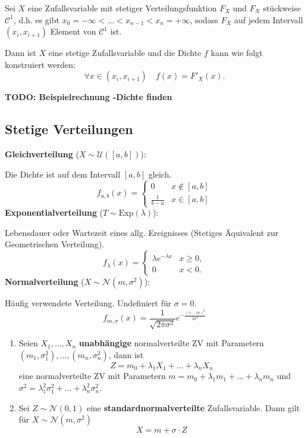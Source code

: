 Sei $X$ eine Zufallsvariable mit stetiger Verteilungsfunktion $F_X$ und $F_X$ stückweise $\mathcal{C}^1$, d.h. es gibt $x_0 = - \infty < \ldots < x_{n-1} < x_n = +\infty$, sodass $F_X$ auf jedem Intervall $(x_i, x_{i+1})$ Element von $\mathcal{C}^1$ ist. 

Dann ist $X$ eine stetige Zufallsvariable und die Dichte $f$ kann wie folgt konstruiert werden:
$$\forall x \in (x_i, x_{i+1}) \quad f(x) = F'_X(x).$$

\textbf{TODO: Beispielrechnung -Dichte finden}

\subsection{Stetige Verteilungen}
\textbf{Gleichverteilung} ($X \sim \mathcal{U}([a,b])$): 

Die Dichte ist auf dem Intervall $[a, b]$ gleich. 
$$f_{a,b}(x) = \begin{cases}
    0 & x \notin [a,b]\\
    \frac{1}{b-a} & x \in [a,b]
\end{cases}$$
\textbf{Exponentialverteilung} ($T \sim \text{Exp}(\lambda)$): 

Lebensdauer oder Wartezeit eines allg. Ereignisses (Stetiges Äquivalent zur Geometrischen Verteilung).
$$f_\lambda(x) = \begin{cases}
    \lambda e^{-\lambda x} & x \ge 0,\\
    0 & x < 0.
\end{cases}$$ 
\textbf{Normalverteilung} ($X \sim \mathcal{N}(m, \sigma^2)$): 

Häufig verwendete Verteilung. Undefiniert für $\sigma = 0$.
$$f_{m, \sigma}(x) = \frac{1}{\sqrt{2\pi\sigma^2}}e^{-\frac{(x-m)^2}{2\sigma^2}}$$
\begin{enumerate}
    \item Seien $X_1, \ldots, X_n$ \textbf{unabhängige} normalverteilte ZV mit Parametern $(m_1,\sigma_1^2), \ldots, (m_n, \sigma_n^2)$, dann ist 
    $$Z = m_0 + \lambda_1 X_1 + \ldots + \lambda_n X_n$$
    eine normalverteilte ZV mit Parametern $m = m_0 + \lambda_1 m_1 + \ldots + \lambda_n m_n$ und $\sigma^2 = \lambda_1^2 \sigma_1^2 + \ldots + \lambda_n^2 \sigma_n^2$.
    \item Sei $Z \sim \mathcal{N}(0,1)$ eine \textbf{standardnormalverteilte} Zufallsvariable. Dann gilt für $X \sim \mathcal{N}(m, \sigma^2)$ 
    $$X = m + \sigma \cdot Z$$   
\end{enumerate}


